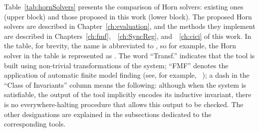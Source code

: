 Table~\cref{tab:hornSolvers} presents the comparison of Horn solvers: existing ones (upper block) and those proposed in this work (lower block). The proposed Horn solvers are described in Chapter~\ref{ch:evaluation}, and the methods they implement are described in Chapters~\ref{ch:fmf},~~\ref{ch:SyncReg}, and~~\ref{ch:cici} of this work. In the table, for brevity, the name \theringen{} is abbreviated to \theringenShort{}, so for example, the Horn solver \ringenSync{} in the table is represented as \ringenSyncShort{}. The word ``Transf.'' indicates that the tool is built using non-trivial transformations of the system; ``FMF'' denotes the application of automatic finite model finding (see, for example, ~\cite{10.1007/978-3-319-40970-2_20,reynolds2013finite}); a dash in the ``Class of Invariants'' column means the following: although when the system is satisfiable, the output of the tool implicitly encodes its inductive invariant, there is no everywhere-halting procedure that allows this output to be checked. The other designations are explained in the subsections dedicated to the corresponding tools.

